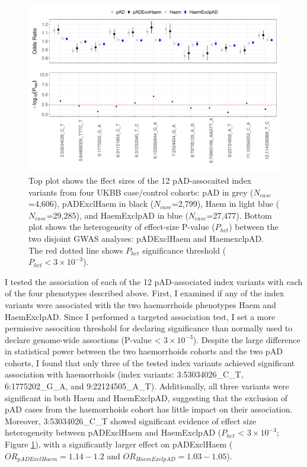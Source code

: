 \begin{figure}[H]
  \centering    
  \includegraphics[width=1.0\textwidth]{combined_forest_het_plt}
  \caption[Figure]{Top plot shows the ffect sizes of the 12 pAD-assocaited index variants from four UKBB case/control cohorts: pAD in grey ($N_{case}$=4,606), pADExclHaem in black ($N_{case}$=2,799), Haem in light blue ($N_{case}$=29,285), and HaemExclpAD in blue ($N_{case}$=27,477). Bottom plot shows the heterogeneity of effect-size P-value ($P_{het}$) between the two disjoint GWAS analyses: pADExclHaem and HaemexclpAD. The red dotted line shows $P_{het}$ significance threshold ($P_{het} < 3\times10^{-3}$).}
  \label{fig:combined_forest_het_plot}
  \end{figure}

I tested the association of each of the 12 pAD-associated index variants with each of the four phenotypes described above. First, I examined if any of the index variants were associated with the two haemorrhoids phenotypes Haem and HaemExclpAD. Since I performed a targeted association test, I set a more permissive assocition threshold for declaring significance than normally used to declare genome-wide assoctions (P-value < $3\times10^{-3}$). Despite the large difference in statistical power between the two haemorrhoids cohorts and the two pAD cohorts, I found that only three of the tested index variants achieved significant association with haemorrhoids (index variants: 3:53034026\_C\_T, 6:1775202\_G\_A, and 9:22124505\_A\_T). Additionally, all three variants were significant in both Haem and HaemExclpAD, suggesting that the exclusion of pAD cases from the haemorrhoids cohort has little impact on their association. Moreover, 3:53034026\_C\_T showed significant evidence of effect size heterogeneity between pADExclHaem and HaemExclpAD ($P_{het}$ < $3\times10^{-3}$; Figure \ref{fig:combined_forest_het_plot}), with a significantly larger effect on pADExclHaem ($OR_{pADExclHaem}=1.14-1.2$ and $OR_{HaemExclpAD}=1.03-1.05$).

